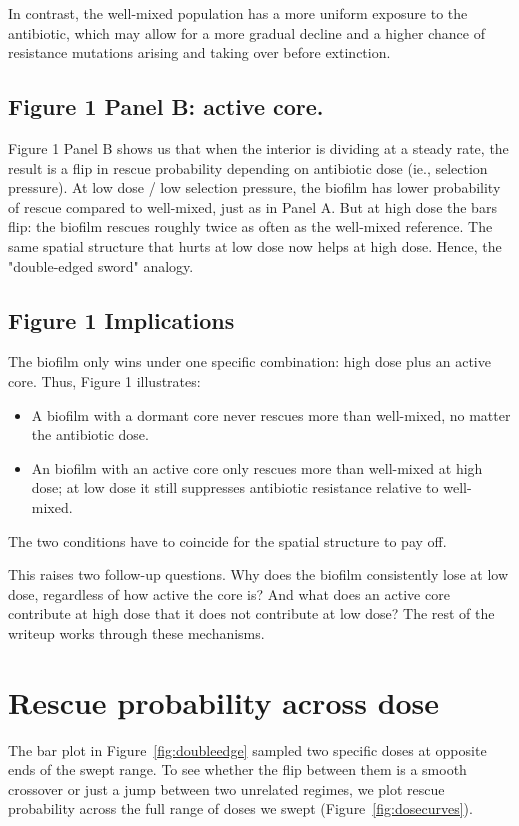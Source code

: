 \documentclass[11pt]{article}
\begin{document}
In contrast, the well-mixed population has a more uniform exposure to the antibiotic, which may allow for a more gradual decline and a higher chance of resistance mutations arising and taking over before extinction.

\subsection{Figure 1 Panel B: active core.}
Figure 1 Panel B shows us that when the interior is dividing at a steady rate, the result is a flip in rescue probability depending on antibiotic dose (ie., selection pressure). At low dose / low selection pressure, the biofilm has lower probability of rescue compared to well-mixed, just as in Panel A. But at high dose the bars flip: the biofilm rescues roughly twice as often as the well-mixed reference. The same spatial structure that hurts at low dose now helps at high dose. Hence, the "double-edged sword" analogy.

\subsection{Figure 1 Implications}
The biofilm only wins under one specific combination: high dose plus an
active core. Thus, Figure 1 illustrates:
\begin{itemize}
    \item A biofilm with a dormant core never rescues more than well-mixed, no matter the antibiotic dose.
    \item An biofilm with an active core only rescues more than well-mixed at high dose; at low dose it still suppresses antibiotic resistance relative to well-mixed.
\end{itemize}
The two conditions have to coincide for the spatial structure to pay
off.

This raises two follow-up questions. Why does the biofilm consistently
lose at low dose, regardless of how active the core is? And what does
an active core contribute at high dose that it does not contribute at
low dose? The rest of the writeup works through these mechanisms.



\section{Rescue probability across dose}
\label{sec:dosecurves}


The bar plot in Figure~\ref{fig:doubleedge} sampled two specific
doses at opposite ends of the swept range. To see whether the flip
between them is a smooth crossover or just a jump between two
unrelated regimes, we plot rescue probability across the full
range of doses we swept (Figure~\ref{fig:dosecurves}).
\end{document}
